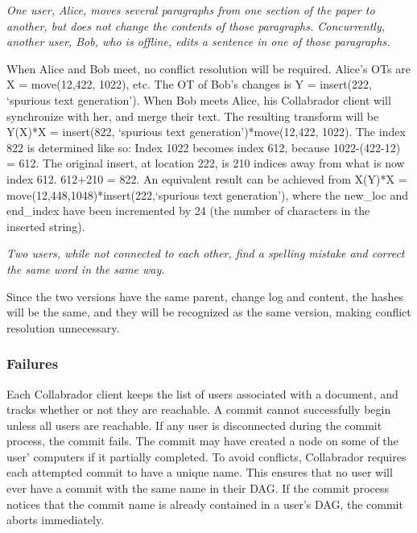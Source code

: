 \documentclass[11pt,titlepage]{article}
\begin{document}
\emph{One user, Alice, moves several paragraphs from one section of
  the paper to another, but does not change the contents of those
  paragraphs. Concurrently, another user, Bob, who is offline, edits a
  sentence in one of those paragraphs.}

When Alice and Bob meet, no conflict resolution will be
required. Alice's OTs are X = move(12,422, 1022), etc.  The OT of
Bob's changes is Y = insert(222, `spurious text generation'). When Bob
meets Alice, his Collabrador client will synchronize with her, and
merge their text. The resulting transform will be Y(X)*X = insert(822,
`spurious text generation')*move(12,422, 1022). The index 822 is
determined like so: Index 1022 becomes index 612, because
1022-(422-12) = 612.  The original insert, at location 222, is 210
indices away from what is now index 612.  612+210 = 822. An equivalent
result can be achieved from X(Y)*X =
move(12,448,1048)*insert(222,`spurious text generation'), where the
new\_loc and end\_index have been incremented by 24 (the number of
characters in the inserted string).

\emph{Two users, while not connected to each other, find a spelling
  mistake and correct the same word in the same way.}

Since the two versions have the same parent, change log and content,
the hashes will be the same, and they will be recognized as the same
version, making conflict resolution unnecessary.

\subsubsection{Failures}

Each Collabrador client keeps the list of users associated with a
document, and tracks whether or not they are reachable. A commit
cannot successfully begin unless all users are reachable. If any user
is disconnected during the commit process, the commit fails. The
commit may have created a node on some of the user' computers if it
partially completed. To avoid conflicts, Collabrador requires each
attempted commit to have a unique name. This ensures that no user will
ever have a commit with the same name in their DAG. If the commit
process notices that the commit name is already contained in a user's
DAG, the commit aborts immediately.
\end{document}
